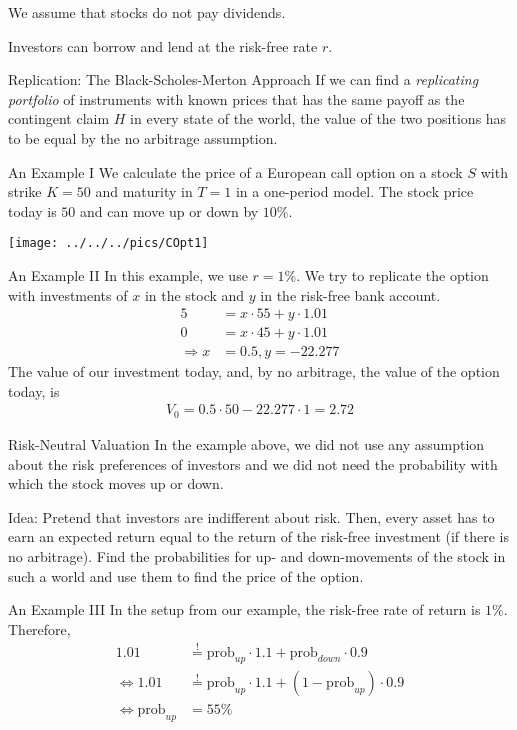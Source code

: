 		We assume that stocks do not pay dividends.
		
		Investors can borrow and lend at the risk-free rate $r$.


Replication: The Black-Scholes-Merton Approach
	If we can find a \emph{replicating portfolio} of instruments with known prices
	that has the same payoff as the contingent claim $H$ in every state of the world, the value of the
	two positions has to be equal by the no arbitrage assumption.


An Example I
	We calculate the price of a European call option on a stock $S$ with strike
	$K=50$ and maturity in $T=1$ in a one-period model. The stock price today is
	$50$ and can move up or down by $10\%$.
	
	\center
	\texttt{[image: ../../../pics/COpt1]}


An Example II
	In this example, we use $r=1\%$. We try to replicate the option with
	investments of $x$ in the stock and $y$ in the risk-free bank account.
		\begin{align*}
			5 &= x \cdot 55 + y \cdot 1.01 \\
			0 &= x \cdot 45 + y \cdot 1.01 \\
			\Rightarrow  x &= 0.5, y= -22.277
		\end{align*}
	The value of our investment today, and, by no arbitrage, the value of the option
	today, is
		\begin{align*}
			V_0 = 0.5 \cdot 50 -22.277 \cdot 1 = 2.72
		\end{align*}


Risk-Neutral Valuation
	In the example above, we did not use any assumption about the risk
  preferences of investors and we did not need the probability with which the
  stock moves up or down.
  
	Idea: Pretend that investors are indifferent about risk. Then, every
  asset has to earn an expected return equal to the return of the risk-free
  investment (if there is no arbitrage). Find the probabilities for up- and
  down-movements of the stock in such a world and use them to find the price of
  the option.


An Example III
	In the setup from our example, the risk-free rate of return is $1\%$. Therefore,
		\begin{align*}
			1.01 &\stackrel{!}{=} \text{prob}_{up} \cdot 1.1 + \text{prob}_{down} \cdot 0.9 \\
			\Leftrightarrow 1.01 &\stackrel{!}{=} \text{prob}_{up} \cdot 1.1 + (1-\text{prob}_{up})
			\cdot 0.9 \\
			\Leftrightarrow \text{prob}_{up} &= 55\%
		\end{align*}
		
